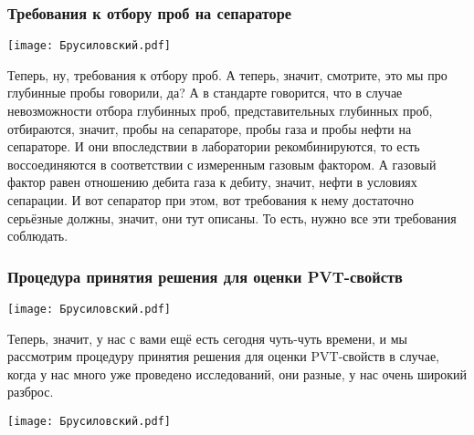 \documentclass[main.tex]{subfiles}
\begin{document}
\subsubsection{Требования к отбору проб на сепараторе}

\begin{center}
\texttt{[image: Брусиловский.pdf]}
\end{center}

Теперь, ну, требования к отбору проб.
А теперь, значит, смотрите, это мы про глубинные пробы говорили, да?
А в стандарте говорится, что в случае невозможности отбора глубинных проб, представительных глубинных проб, отбираются, значит, пробы на сепараторе, пробы газа и пробы нефти на сепараторе.
И они впоследствии в лаборатории рекомбинируются, то есть воссоединяются в соответствии с измеренным газовым фактором.
А газовый фактор равен отношению дебита газа к дебиту, значит, нефти в условиях сепарации.
И вот сепаратор при этом, вот требования к нему достаточно серьёзные должны, значит, они тут описаны.
То есть, нужно все эти требования соблюдать.

\subsubsection{Процедура принятия решения для оценки PVT-свойств}

\begin{center}
\texttt{[image: Брусиловский.pdf]}
\end{center}

Теперь, значит, у нас с вами ещё есть сегодня чуть-чуть времени, и мы рассмотрим процедуру принятия решения для оценки PVT-свойств в случае, когда у нас много уже проведено исследований, они разные, у нас очень широкий разброс.

\begin{center}
\texttt{[image: Брусиловский.pdf]}
\end{center}
\end{document}
